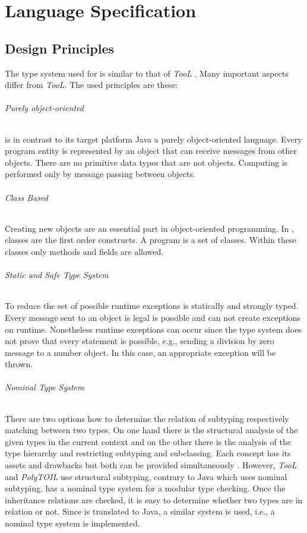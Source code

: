 \part{Language Specification}
\chapter{Design Principles}
The type system used for \ooplss is similar to that of \emph{TooL}
\cite{gawecki_tool:_1995}. Many important aspects differ from
\emph{TooL}. The used principles are these:

\paragraph{Purely object-oriented}
\ooplss is in contrast to its target platform Java a purely
object-oriented language. Every program entity is represented by an
object that can receive messages from other objects. There are no
primitive data types that are not objects. Computing is performed only
by message passing between objects.

\paragraph{Class Based}
Creating new objects are an essential part in object-oriented
programming. In \ooplss, classes are the first order constructs. A program is
a set of classes. Within these classes only methods and fields are allowed.

\paragraph{Static and Safe Type System}
To reduce the set of possible runtime exceptions \ooplss is statically
and strongly typed. Every message sent to an object is legal is possible 
and can not create exceptions on runtime. Nonetheless runtime exceptions
can occur since the type system does not prove that every statement is
possible, e.g., sending a division by zero message to a number object.
In this case, an appropriate exception will be thrown.

\paragraph{Nominal Type System}
There are two options how to determine the relation of subtyping
respectively matching between two types. On one hand there is the structural
analysis of the given types in the current context and on the other there
is the analysis of the type hierarchy and restricting subtyping and
subclassing. Each concept has its assets and drawbacks but both can
be provided simultaneously \cite{malayeri_integrating_2008}. However,
\emph{TooL} and \emph{PolyTOIL} use structural subtyping, contrary to
Java which uses nominal subtyping. \ooplss has a nominal type system
for a modular type checking. Once the inheritance relations are checked,
it is easy to determine whether two types are in relation or not. Since
\ooplss is translated to Java, a similar system is used, i.e., a nominal
type system is implemented.


